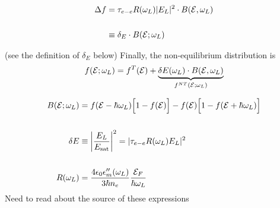 \begin{align}
\Delta f &= \tau_{e-e}R(\omega _{\scriptsize L}) |E_{\scriptsize L}|^{2} \cdot B(\mathcal{E},\omega _{\scriptsize L}) \\ \\ 
&\equiv\delta_{E}\cdot B(\mathcal{E};\omega _{\scriptsize L}) 
\label{eq:photon_absorption_delta_f}
\end{align}

(see the definition of $\delta_{E}$ below)
Finally, the non-equilibrium distribution is
\begin{equation}
f(\mathcal{E};\omega _{\scriptsize L}) = f^{\scriptsize T}(\mathcal{E}) + \underbrace{ \delta E(\omega _{\scriptsize L})\cdot B(\mathcal{E},\omega _{\scriptsize L}) }_{ f^{\scriptsize NT}(\mathcal{E};\omega _{\scriptsize L}) } 
\label{eq:photon_absorption_noneq_distribution}
\end{equation}
\begin{tcolorbox}[title={Note: Definitions of B, $\boldsymbol{\delta_{E}}$ and R}]
\begin{align}
B(\mathcal{E};\omega _{\scriptsize L}) &= f(\mathcal{E}-\hbar\omega _{\scriptsize L})\Big[ 1-f(\mathcal{E}) \Big] - f(\mathcal{E})\Big[ 1-f(\mathcal{E}+\hbar\omega _{\scriptsize L}) \Big] \\ \\ 
\delta E &\equiv \left| \frac{E_{\scriptsize L}}{E_{\text{sat}}} \right|^{2} = |\tau_{e-e}R(\omega _{\scriptsize L})E_{\scriptsize L}|^{2} \\ \\ 
R(\omega _{\scriptsize L}) &= \frac{4\epsilon_{0}\epsilon_{m}''(\omega _{\scriptsize L})}{3\hbar n_{e}} \frac{\mathcal{E}_{\scriptsize F}}{\hbar \omega _{\scriptsize L}}
\label{eq:photon_absorption_definitions}
\end{align}
Need to read about the source of these expressions
\end{tcolorbox}
